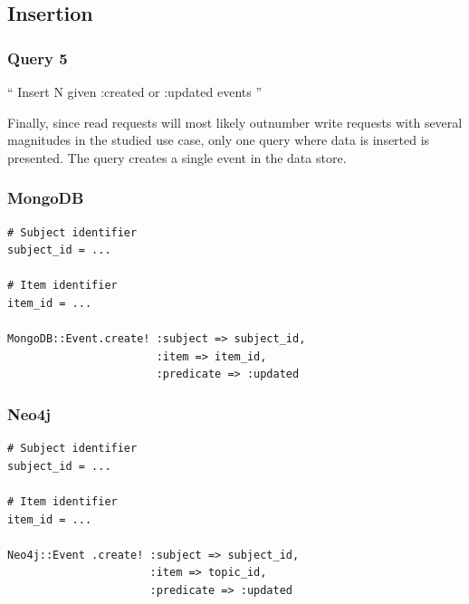 \subsection{Insertion}
\label{subsec:insertion}

\subsubsection{Query 5}
\label{subsubsec:query-5}

``
Insert N given :created or :updated events
''

Finally, since read requests will most likely outnumber write requests with several magnitudes in the studied use case, only one query where data is inserted is presented.
The query creates a single event in the data store.

\subsubsection*{MongoDB}

\begin{verbatim}
# Subject identifier
subject_id = ...

# Item identifier
item_id = ...

MongoDB::Event.create! :subject => subject_id,
                       :item => item_id,
                       :predicate => :updated
\end{verbatim}

\subsubsection*{Neo4j}

\begin{verbatim}
# Subject identifier
subject_id = ...

# Item identifier
item_id = ...

Neo4j::Event .create! :subject => subject_id,
                      :item => topic_id,
                      :predicate => :updated
\end{verbatim}

